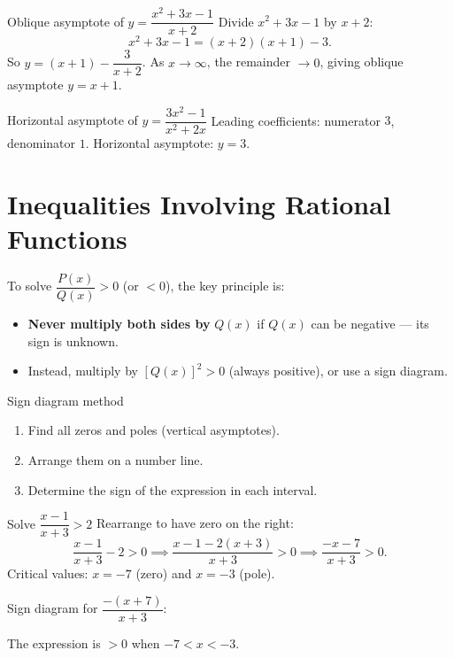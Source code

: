 \documentclass[12pt,a4paper]{article}
\theoremstyle{defstyle}
\begin{document}
\begin{example}{Oblique asymptote of $y=\dfrac{x^2+3x-1}{x+2}$}{}
Divide \(x^2+3x-1\) by \(x+2\):
\[
  x^2+3x-1 = (x+2)(x+1) - 3.
\]
So \(y = (x+1) - \dfrac{3}{x+2}\).
As \(x\to\infty\), the remainder \(\to 0\), giving oblique asymptote \(y=x+1\).
\end{example}

\begin{example}{Horizontal asymptote of $y=\dfrac{3x^2-1}{x^2+2x}$}{}
Leading coefficients: numerator \(3\), denominator \(1\).  Horizontal asymptote: \(y=3\).
\end{example}

\section{Inequalities Involving Rational Functions}

To solve \(\dfrac{P(x)}{Q(x)} > 0\) (or \(<0\)), the key principle is:
\begin{itemize}[nosep]
  \item \textbf{Never multiply both sides by} \(Q(x)\) if \(Q(x)\) can be negative --- its sign is unknown.
  \item Instead, multiply by \([Q(x)]^2 > 0\) (always positive), or use a sign diagram.
\end{itemize}

\begin{result}{Sign diagram method}{}
\begin{enumerate}[nosep]
  \item Find all zeros and poles (vertical asymptotes).
  \item Arrange them on a number line.
  \item Determine the sign of the expression in each interval.
\end{enumerate}
\end{result}

\begin{example}{Solve $\dfrac{x-1}{x+3}>2$}{}
Rearrange to have zero on the right:
\[
  \frac{x-1}{x+3}-2>0 \implies \frac{x-1-2(x+3)}{x+3}>0 \implies \frac{-x-7}{x+3}>0.
\]
Critical values: \(x=-7\) (zero) and \(x=-3\) (pole).

Sign diagram for \(\dfrac{-(x+7)}{x+3}\):

\begin{center}
\end{center}

The expression is \(>0\) when \(-7<x<-3\).
\end{example}
\end{document}
